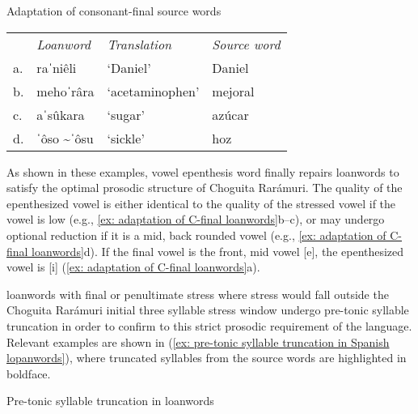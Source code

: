\ea\label{ex: adaptation of C-final loanwords}
{Adaptation of consonant-final source words}

\begin{tabular}{llll}
    & \textit{Loanword} & \textit{Translation} & \textit{Source word} \\
     a.& raˈniêli & `Daniel' & Daniel\\
     b.& mehoˈrâra & `acetaminophen' & mejoral\\
     c.& aˈsûkara &	`sugar' &	azúcar \\
     d.& ˈôso \textasciitilde ˈôsu &	`sickle' &	hoz \\
\end{tabular}
    \z

As shown in these examples, vowel epenthesis word finally repairs loanwords to satisfy the optimal prosodic structure of Choguita Rarámuri. The quality of the epenthesized vowel is either identical to the quality of the stressed vowel if the vowel is low (e.g., \ref{ex: adaptation of C-final loanwords}b--c), or may undergo optional reduction if it is a mid, back rounded vowel (e.g., \ref{ex: adaptation of C-final loanwords}d). If the final vowel is the front, mid vowel [e], the epenthesized vowel is [i] (\ref{ex: adaptation of C-final loanwords}a).

 loanwords with final or penultimate stress where stress would fall outside the Choguita Rarámuri initial three syllable stress window undergo pre-tonic syllable truncation in order to confirm to this strict prosodic requirement of the language. Relevant examples are shown in (\ref{ex: pre-tonic syllable truncation in Spanish lopanwords}), where truncated syllables from the  source words are highlighted in boldface.

\ea\label{ex: pre-tonic syllable truncation in Spanish lopanwords}
{Pre-tonic syllable truncation in  loanwords}

    \z
\z

